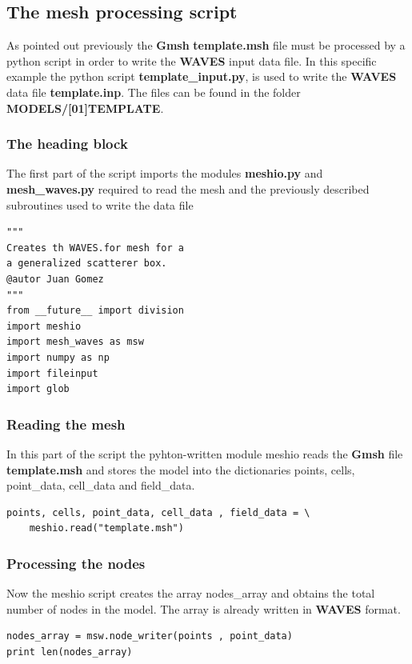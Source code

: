 \documentclass[12pt,letterpaper]{article}
\begin{document}
\newpage

\subsection*{The mesh processing script}
As pointed out previously the {\bf Gmsh} {\bf template.msh} file must be processed by a python script in order to write the {\bf WAVES} input data file. In this specific example the python script {\bf template\_input.py}, is used to write the {\bf WAVES} data file {\bf template.inp}. The files can be found in the folder {\bf MODELS/[01]TEMPLATE}. 


\subsubsection*{The heading block}
The first part of the script imports the modules {\bf meshio.py} and {\bf mesh\_waves.py} required to read the mesh and the previously described subroutines used to write the data file
\begin{verbatim}
"""
Creates th WAVES.for mesh for a
a generalized scatterer box.
@autor Juan Gomez
"""
from __future__ import division
import meshio
import mesh_waves as msw
import numpy as np
import fileinput
import glob
\end{verbatim}

\subsubsection*{Reading the mesh}
In this part of the script the pyhton-written module meshio reads the {\bf Gmsh} file {\bf template.msh} and stores the model into the dictionaries points, cells, point\_data, cell\_data and field\_data.

\begin{verbatim}
points, cells, point_data, cell_data , field_data = \
    meshio.read("template.msh")
\end{verbatim}
 

\subsubsection*{Processing the nodes}
Now the meshio script creates the array nodes\_array and obtains the total number of nodes in the model. The array is already written in {\bf WAVES} format.
\begin{verbatim}
nodes_array = msw.node_writer(points , point_data)
print len(nodes_array)
\end{verbatim}
\end{document}
